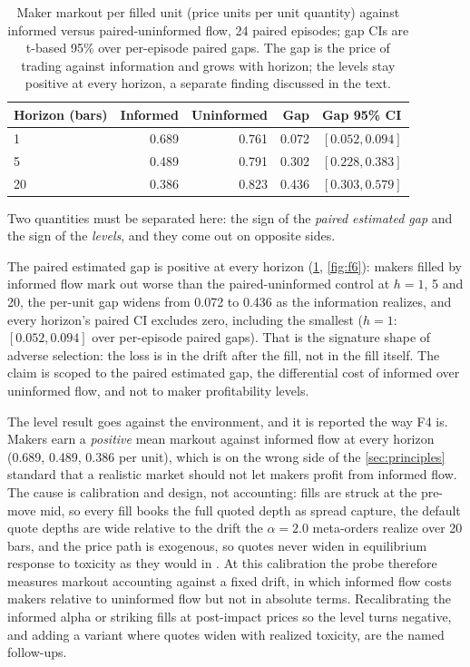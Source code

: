 \begin{table}[t]
\centering
\caption{Maker markout per filled unit (price units per unit quantity) against informed versus paired-uninformed flow, 24 paired episodes; gap CIs are t-based 95\% over per-episode paired gaps. The gap is the price of trading against information and grows with horizon; the levels stay positive at every horizon, a separate finding discussed in the text.}
\label{tab:f6}
\small
\begin{tabular}{lrrrl}
\toprule
Horizon (bars) & Informed & Uninformed & Gap & Gap 95\% CI \\
\midrule
1 & 0.689 & 0.761 & 0.072 & $[0.052, 0.094]$ \\
5 & 0.489 & 0.791 & 0.302 & $[0.228, 0.383]$ \\
20 & 0.386 & 0.823 & 0.436 & $[0.303, 0.579]$ \\
\bottomrule
\end{tabular}
\end{table}

Two quantities must be separated here: the sign of the \emph{paired estimated gap} and the sign of the \emph{levels}, and they come out on opposite sides.

The paired estimated gap is positive at every horizon (\cref{tab:f6}, \cref{fig:f6}): makers filled by informed flow mark out worse than the paired-uninformed control at $h = 1$, 5 and 20, the per-unit gap widens from 0.072 to 0.436 as the information realizes, and every horizon's paired CI excludes zero, including the smallest ($h = 1$: $[0.052, 0.094]$ over per-episode paired gaps). That is the signature shape of adverse selection: the loss is in the drift after the fill, not in the fill itself. The claim is scoped to the paired estimated gap, the differential cost of informed over uninformed flow, and not to maker profitability levels.

The level result goes against the environment, and it is reported the way F4 is. Makers earn a \emph{positive} mean markout against informed flow at every horizon (0.689, 0.489, 0.386 per unit), which is on the wrong side of the \cref{sec:principles} standard that a realistic market should not let makers profit from informed flow. The cause is calibration and design, not accounting: fills are struck at the pre-move mid, so every fill books the full quoted depth as spread capture, the default quote depths are wide relative to the drift the $\alpha = 2.0$ meta-orders realize over 20 bars, and the price path is exogenous, so quotes never widen in equilibrium response to toxicity as they would in \citet{glosten1985bid}. At this calibration the probe therefore measures markout accounting against a fixed drift, in which informed flow costs makers relative to uninformed flow but not in absolute terms. Recalibrating the informed alpha or striking fills at post-impact prices so the level turns negative, and adding a variant where quotes widen with realized toxicity, are the named follow-ups.

